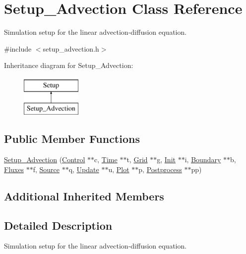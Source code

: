 \hypertarget{class_setup___advection}{}\section{Setup\+\_\+\+Advection Class Reference}
\label{class_setup___advection}


Simulation setup for the linear advection-\/diffusion equation.  




{\ttfamily \#include $<$setup\+\_\+advection.\+h$>$}

Inheritance diagram for Setup\+\_\+\+Advection\+:\begin{figure}[H]
\begin{center}
\leavevmode
\includegraphics[height=2.000000cm]{class_setup___advection}
\end{center}
\end{figure}
\subsection*{Public Member Functions}
\begin{DoxyCompactItemize}
\item 
\hyperlink{class_setup___advection_aa02d5e7d008f8860a6c54dff04011212}{Setup\+\_\+\+Advection} (\hyperlink{class_control}{Control} $\ast$$\ast$c, \hyperlink{class_time}{Time} $\ast$$\ast$t, \hyperlink{class_grid}{Grid} $\ast$$\ast$g, \hyperlink{class_init}{Init} $\ast$$\ast$i, \hyperlink{class_boundary}{Boundary} $\ast$$\ast$b, \hyperlink{class_fluxes}{Fluxes} $\ast$$\ast$f, \hyperlink{class_source}{Source} $\ast$$\ast$q, \hyperlink{class_update}{Update} $\ast$$\ast$u, \hyperlink{class_plot}{Plot} $\ast$$\ast$p, \hyperlink{class_postprocess}{Postprocess} $\ast$$\ast$pp)
\end{DoxyCompactItemize}
\subsection*{Additional Inherited Members}


\subsection{Detailed Description}
Simulation setup for the linear advection-\/diffusion equation. 

